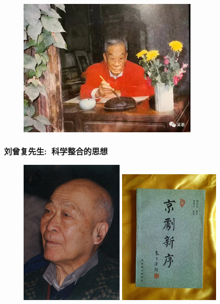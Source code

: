 \documentclass[cjk,slidestop,compress,mathserif,blue]{beamer}
\begin{document}
\frame
{
	\frametitle{}
\begin{figure}[h!]
\centering
\vspace{-0.15in}
\includegraphics[height=0.65\textwidth,width=0.80\textwidth,clip]{Figures/PekOpe_Zhu.jpg}
\label{Zhu_Jiajin-2}
\end{figure}
}

\frame
{
	\frametitle{刘曾复先生:~科学整合的思想}
\begin{figure}[h!]
\centering
\vspace{-0.2in}
\includegraphics[height=0.64\textwidth,width=0.46\textwidth,viewport=0 0 360 520,clip]{Figures/Liu_Zengfu.jpg}
\hskip 5pt
\includegraphics[height=0.62\textwidth,width=0.45\textwidth,viewport=100 85 660 875,clip]{Figures/Liu_Xinxu.jpg}
\label{Liu_Zengfu}
\end{figure}
}
\end{document}
